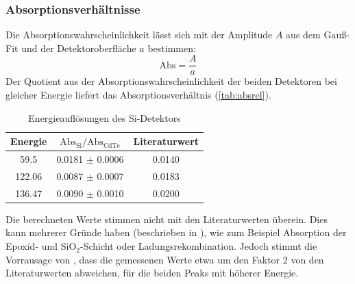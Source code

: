 \subsubsection{Absorptionsverhältnisse}
Die Absorptionswahrscheinlichkeit lässt sich mit der Amplitude $A$ aus dem Gauß-Fit und der Detektoroberfläche $a$ bestimmen: 
\begin{equation}
  \text{Abs} = \frac{A}{a}
\end{equation}
Der Quotient aus der Absorptionswahrscheinlichkeit der beiden Detektoren bei gleicher Energie liefert das Absorptionsverhältnis 
(\autoref{tab:absrel}).
\begin{table}[H]
\begin{center}
\begin{tabular}{|c|c|c|}
\hline 
Energie & $\text{Abs}_{\text{Si}} / \text{Abs}_{\text{CdTe}}$ & Literaturwert \cite{staatsex} \\ \hline
59.5 & 0.0181    $\pm$ 0.0006 & 0.0140 \\ \hline
122.06 & 0.0087 $\pm$ 0.0007 & 0.0183 \\ \hline
136.47 & 0.0090 $\pm$ 0.0010 & 0.0200 \\ \hline
\end{tabular}
\caption{Energieauflösungen des Si-Detektors}
\label{tab:absrel}
\end{center}
\end{table}
Die berechneten Werte stimmen nicht mit den Literaturwerten \cite{staatsex} überein. Dies kann mehrerer Gründe haben 
(beschrieben in \cite{staatsex}), wie zum Beispiel Absorption der Epoxid- und $\text{SiO}_2$-Schicht oder Ladungsrekombination. Jedoch 
stimmt die Vorrausage von \cite{staatsex}, dass die gemessenen Werte etwa um den Faktor 2 von den Literaturwerten abweichen, für die beiden Peaks 
mit höherer Energie.
